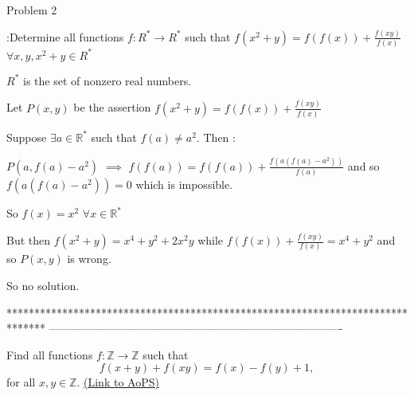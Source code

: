 \begin{solution}
	\begin{tcolorbox}\begin{bolded}Problem 2\end{bolded}:Determine all functions $ f: R^* \to R^*$ such that $ f(x^2 + y) = f(f(x)) + \frac {f(xy)}{f(x)}$   $ \forall x,y,x^2 + y \in R^*$

$ R^*$ is the set of nonzero real numbers.\end{tcolorbox}

Let $ P(x,y)$ be the assertion $ f(x^2+y)=f(f(x))+\frac{f(xy)}{f(x)}$

Suppose $ \exists a\in\mathbb R^*$ such that $ f(a)\neq a^2$. Then :

$ P(a,f(a)-a^2)$ $ \implies$ $ f(f(a))=f(f(a))+\frac{f(a(f(a)-a^2))}{f(a)}$ and so $ f(a(f(a)-a^2))=0$ which is impossible.

So $ f(x)=x^2$ $ \forall x\in\mathbb R^*$

But then $ f(x^2+y)=x^4+y^2+2x^2y$ while $ f(f(x))+\frac{f(xy)}{f(x)}=x^4+y^2$ and so $ P(x,y)$ is wrong.

So no solution.
\end{solution}



*******************************************************************************
-------------------------------------------------------------------------------

\begin{problem}
	Find all functions  $ f : \mathbb{Z} \rightarrow \mathbb{Z}$ such that \[ f(x+y) + f(xy) = f(x) - f(y) +1,\] for all $x,y \in \mathbb{Z}$.
	\flushright \href{https://artofproblemsolving.com/community/c6h301788}{(Link to AoPS)}
\end{problem}



